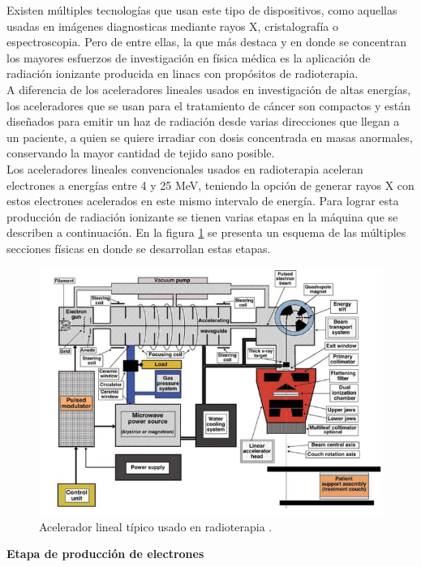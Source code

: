 Existen múltiples tecnologías que usan este tipo de dispositivos, como aquellas usadas en imágenes diagnosticas mediante rayos X, cristalografía o espectroscopia. Pero de entre ellas, la que más destaca y en donde se concentran los mayores esfuerzos de investigación en física médica es la aplicación de radiación ionizante producida en linacs con propósitos de radioterapia\cite{podgorsak}. \\

A diferencia de los aceleradores lineales usados en investigación de altas energías, los aceleradores que se usan para el tratamiento de cáncer son compactos y están diseñados para emitir un haz de radiación desde varias direcciones que llegan a un paciente, a quien se quiere irradiar con dosis concentrada en masas anormales, conservando la mayor cantidad de tejido sano posible.\\

Los aceleradores lineales convencionales usados en radioterapia aceleran electrones a energías entre 4 y 25 MeV, teniendo la opción de generar rayos X con estos electrones acelerados en este mismo intervalo de energía. Para lograr esta producción de radiación ionizante se tienen varias etapas en la máquina que se describen a continuación. En la figura \ref{fig:acelerador} se presenta un esquema de las múltiples secciones físicas en donde se desarrollan estas etapas.\\
\begin{figure}[H]
	\centering
	\includegraphics[width=0.9\linewidth]{images/linalc.png}
	\caption{Acelerador lineal típico usado en radioterapia \cite{podgorsak}.}
	\label{fig:acelerador}
\end{figure}

\textbf{Etapa de producción de electrones}\\


